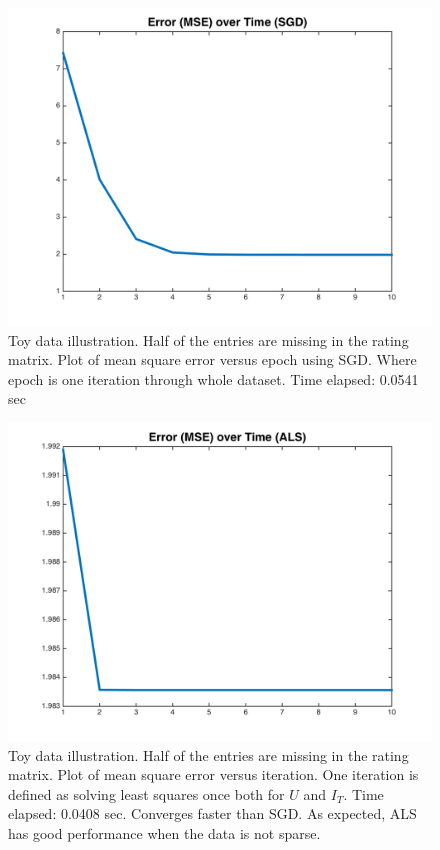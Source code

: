 \documentclass[11pt]{article}
\begin{document}
	\begin{figure}[H]
		\centering		
		\includegraphics[width=\wi]{buff3/5}
		\caption{Toy data illustration. Half of the entries are missing in the rating matrix. Plot of mean square error versus epoch using SGD. Where epoch is one iteration through whole dataset. Time elapsed: 0.0541 sec}
		\label{5}		
	\end{figure}
	\begin{figure}[H]
		\centering		
		\includegraphics[width=\wi]{buff3/6}
		\caption{Toy data illustration. Half of the entries are missing in the rating matrix. Plot of mean square error versus iteration. One iteration is defined as solving least squares once both for $U$ and $I_T$. Time elapsed: 0.0408 sec. Converges faster than SGD. As expected, ALS has good performance when the data is not sparse.}
		\label{5}		
	\end{figure}
	
\end{document}
